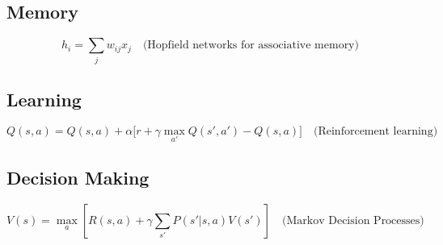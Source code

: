 \documentclass{article}
\theoremstyle{plain}
\begin{document}
\subsection{Memory}
\begin{equation}
    h_i = \sum_{j} w_{ij} x_j \quad \text{(Hopfield networks for associative memory)}
\end{equation}

\subsection{Learning}
\begin{equation}
    Q(s, a) = Q(s, a) + \alpha \big[r + \gamma \max_{a'} Q(s', a') - Q(s, a)\big] \quad \text{(Reinforcement learning)}
\end{equation}

\subsection{Decision Making}
\begin{equation}
    V(s) = \max_a \left[ R(s, a) + \gamma \sum_{s'} P(s'|s, a)V(s') \right] \quad \text{(Markov Decision Processes)}
\end{equation}
\end{document}
